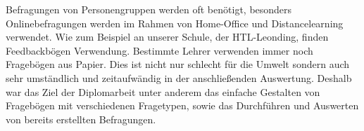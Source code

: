 \author{Raffeiner Christine, Weissengruber Nina}
Befragungen von Personengruppen werden oft benötigt, besonders Onlinebefragungen werden im Rahmen von Home-Office 
und Distancelearning verwendet. Wie zum Beispiel an unserer Schule, der HTL-Leonding, finden Feedbackbögen Verwendung.
Bestimmte Lehrer verwenden immer noch Fragebögen aus Papier. Dies ist nicht nur schlecht für die Umwelt 
sondern auch sehr umständlich und zeitaufwändig in der anschließenden Auswertung. 
\newline
\newline
Deshalb war das Ziel der Diplomarbeit unter anderem das einfache Gestalten von Fragebögen mit verschiedenen 
Fragetypen, sowie das Durchführen und Auswerten von bereits erstellten Befragungen.

